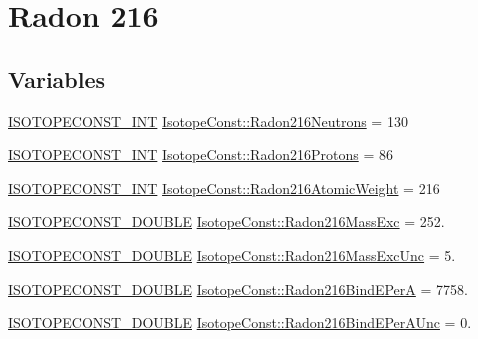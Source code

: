 \hypertarget{group___isotope_const-_radon-_rn216}{}\section{Radon 216}
\label{group___isotope_const-_radon-_rn216}
\subsection*{Variables}
\begin{DoxyCompactItemize}
\item 
\mbox{\hyperlink{group___isotope_const-_macros_ga5f18360b3e99483a35c32d789e62621c}{I\+S\+O\+T\+O\+P\+E\+C\+O\+N\+S\+T\+\_\+\+I\+NT}} \mbox{\hyperlink{group___isotope_const-_radon-_rn216_ga102ebfa4725c1e51a25482670ae9537b}{Isotope\+Const\+::\+Radon216\+Neutrons}} = 130
\item 
\mbox{\hyperlink{group___isotope_const-_macros_ga5f18360b3e99483a35c32d789e62621c}{I\+S\+O\+T\+O\+P\+E\+C\+O\+N\+S\+T\+\_\+\+I\+NT}} \mbox{\hyperlink{group___isotope_const-_radon-_rn216_ga8c5631d6c676358e18d76d8776f4b0ba}{Isotope\+Const\+::\+Radon216\+Protons}} = 86
\item 
\mbox{\hyperlink{group___isotope_const-_macros_ga5f18360b3e99483a35c32d789e62621c}{I\+S\+O\+T\+O\+P\+E\+C\+O\+N\+S\+T\+\_\+\+I\+NT}} \mbox{\hyperlink{group___isotope_const-_radon-_rn216_gaddf01e377fbe6852af4ffac81e8eb781}{Isotope\+Const\+::\+Radon216\+Atomic\+Weight}} = 216
\item 
\mbox{\hyperlink{group___isotope_const-_macros_ga8f45a7272ce02c0b4c65c44636ed719a}{I\+S\+O\+T\+O\+P\+E\+C\+O\+N\+S\+T\+\_\+\+D\+O\+U\+B\+LE}} \mbox{\hyperlink{group___isotope_const-_radon-_rn216_ga215877b59ae9ff12302bf2ebea09807e}{Isotope\+Const\+::\+Radon216\+Mass\+Exc}} = 252.
\item 
\mbox{\hyperlink{group___isotope_const-_macros_ga8f45a7272ce02c0b4c65c44636ed719a}{I\+S\+O\+T\+O\+P\+E\+C\+O\+N\+S\+T\+\_\+\+D\+O\+U\+B\+LE}} \mbox{\hyperlink{group___isotope_const-_radon-_rn216_ga164bc0ce4b7c7e8c59627ed4c6fde1d7}{Isotope\+Const\+::\+Radon216\+Mass\+Exc\+Unc}} = 5.
\item 
\mbox{\hyperlink{group___isotope_const-_macros_ga8f45a7272ce02c0b4c65c44636ed719a}{I\+S\+O\+T\+O\+P\+E\+C\+O\+N\+S\+T\+\_\+\+D\+O\+U\+B\+LE}} \mbox{\hyperlink{group___isotope_const-_radon-_rn216_ga6135c8fd506162bb43a6cfb64284e24d}{Isotope\+Const\+::\+Radon216\+Bind\+E\+PerA}} = 7758.
\item 
\mbox{\hyperlink{group___isotope_const-_macros_ga8f45a7272ce02c0b4c65c44636ed719a}{I\+S\+O\+T\+O\+P\+E\+C\+O\+N\+S\+T\+\_\+\+D\+O\+U\+B\+LE}} \mbox{\hyperlink{group___isotope_const-_radon-_rn216_ga788580b940636de177b311eba8cb0fcd}{Isotope\+Const\+::\+Radon216\+Bind\+E\+Per\+A\+Unc}} = 0.

\end{DoxyCompactItemize}
